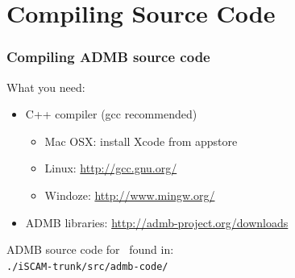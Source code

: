 

\section[Compiling]{Compiling Source Code} %
\label{sec:compiling_source_code}

\begin{frame}
	\frametitle{Compiling ADMB source code}
	What you need:
	\begin{itemize}
		\item C++ compiler (gcc recommended)
		\begin{itemize}
			\item Mac OSX: install Xcode from appstore
			\item Linux: \url{http://gcc.gnu.org/}
			\item Windoze: \url{http://www.mingw.org/}
		\end{itemize}
		\item ADMB libraries: \url{http://admb-project.org/downloads}
	\end{itemize}
	\vfill
	ADMB source code for \iscam\ found in:\\
	\texttt{./iSCAM-trunk/src/admb-code/}
\end{frame}

